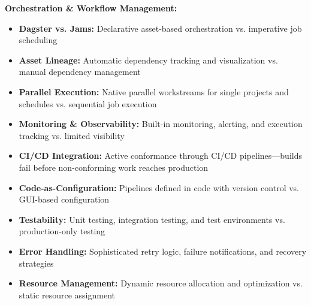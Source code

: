 \documentclass[10pt, a4paper]{article}
\begin{document}
{\footnotesize
\vspace{0.15em}

\hspace{1em}\textbf{Orchestration \& Workflow Management:}
\begin{itemize}[leftmargin=2.5em, itemsep=0.05em]
    \item \textbf{Dagster vs. Jams:} Declarative asset-based orchestration vs. imperative job scheduling
    \item \textbf{Asset Lineage:} Automatic dependency tracking and visualization vs. manual dependency management
    \item \textbf{Parallel Execution:} Native parallel workstreams for single projects and schedules vs. sequential job execution
    \item \textbf{Monitoring \& Observability:} Built-in monitoring, alerting, and execution tracking vs. limited visibility
    \item \textbf{CI/CD Integration:} Active conformance through CI/CD pipelines---builds fail before non-conforming work reaches production
    \item \textbf{Code-as-Configuration:} Pipelines defined in code with version control vs. GUI-based configuration
    \item \textbf{Testability:} Unit testing, integration testing, and test environments vs. production-only testing
    \item \textbf{Error Handling:} Sophisticated retry logic, failure notifications, and recovery strategies
    \item \textbf{Resource Management:} Dynamic resource allocation and optimization vs. static resource assignment
\end{itemize}

\vspace{0.15em}

}
\end{document}
